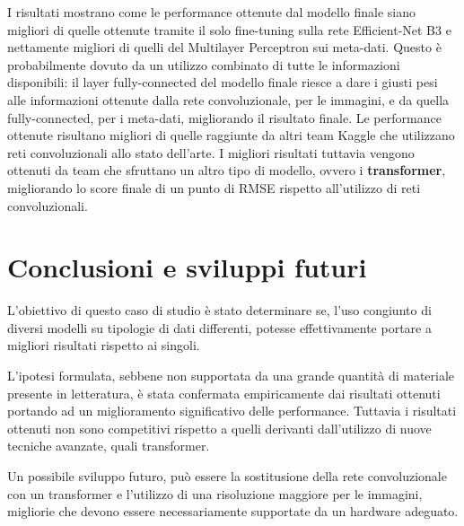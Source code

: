 I risultati mostrano come le performance ottenute dal modello finale siano migliori di quelle ottenute tramite il solo fine-tuning sulla rete Efficient-Net B3 e nettamente migliori di quelli del Multilayer Perceptron sui meta-dati. Questo è probabilmente dovuto da un utilizzo combinato di tutte le informazioni disponibili: il layer fully-connected del modello finale riesce a dare i giusti pesi alle informazioni ottenute dalla rete convoluzionale, per le immagini, e da quella fully-connected, per i meta-dati, migliorando il risultato finale. Le performance ottenute risultano migliori di quelle raggiunte da altri team Kaggle che utilizzano reti convoluzionali allo stato dell'arte. I migliori risultati tuttavia vengono ottenuti da team che sfruttano un altro tipo di modello, ovvero i \textbf{transformer}, migliorando lo score finale di un punto di RMSE rispetto all'utilizzo di reti convoluzionali.


\section{Conclusioni e sviluppi futuri}
L'obiettivo di questo caso di studio è stato determinare se, l'uso congiunto di diversi modelli su tipologie di dati differenti, potesse effettivamente portare  a migliori risultati rispetto ai singoli.

L'ipotesi formulata, sebbene non supportata da una grande quantità di materiale presente in letteratura, è stata confermata empiricamente dai risultati ottenuti portando ad un miglioramento significativo delle performance. Tuttavia i risultati ottenuti non sono competitivi rispetto a quelli derivanti dall'utilizzo di nuove tecniche avanzate, quali transformer.

Un possibile sviluppo futuro, può essere la sostitusione della rete convoluzionale con un transformer e l'utilizzo di una risoluzione maggiore per le immagini, migliorie che devono essere necessariamente supportate da un hardware adeguato.




\appendix

